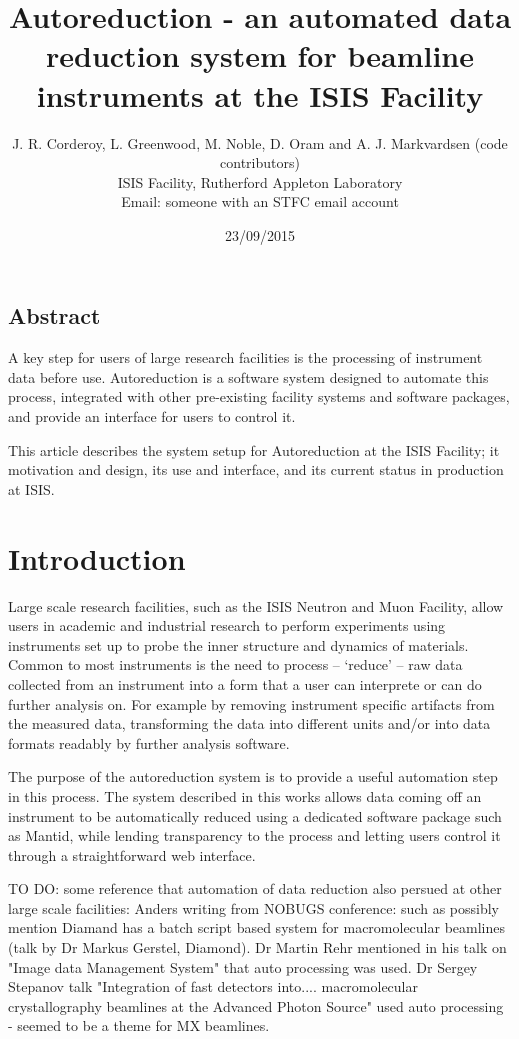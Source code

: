 \documentclass[twocolumn]{article}
\title{\textbf{Autoreduction - an automated data reduction system for beamline instruments at the ISIS Facility}}
\author{J. R. Corderoy, L. Greenwood, M. Noble, D. Oram and A. J. Markvardsen (code contributors)\\
ISIS Facility, Rutherford Appleton Laboratory\\
Email: someone with an STFC email account}
\date{23/09/2015}
\begin{document}
\maketitle

\subsection*{Abstract}\label{abstract}

A key step for users of large research facilities is the
processing of instrument data before use. Autoreduction is a software
system designed to automate this process, integrated with other
pre-existing facility systems and software packages, and provide
an interface for users to control it.

This article describes the system setup for Autoreduction at the ISIS Facility;
it motivation and design, its use and interface, and its current status in production at ISIS.

\section{Introduction}\label{introduction}

Large scale research facilities, such as the ISIS Neutron and Muon
Facility, allow users in academic and industrial research
to perform experiments using instruments set up to probe the inner 
structure and dynamics of materials. 
Common to most instruments is the need to process -- 
`reduce' -- raw data collected from an instrument into a form
that a user can interprete or can do further analysis on. For example
by removing instrument specific artifacts from the measured data, 
transforming the data into different units and/or
into data formats readably by further analysis software.

The purpose of the autoreduction system is to provide a useful automation
step in this process. The system described in this works allows data coming 
off an instrument to be automatically reduced using a dedicated software package 
such as Mantid\cite{mantid}, while lending transparency to the process and
letting users control it through a straightforward web interface.

TO DO: some reference that automation of data reduction also persued at
other large scale facilities: Anders writing from NOBUGS conference: such as 
possibly mention Diamand has a batch script based system 
for macromolecular beamlines (talk by Dr Markus Gerstel, Diamond). Dr Martin Rehr 
mentioned in his talk on "Image data Management System" that auto processing was
used. Dr Sergey Stepanov talk "Integration of fast detectors into.... macromolecular
crystallography beamlines at the Advanced Photon Source" used auto processing - seemed
to be a theme for MX beamlines.  
\end{document}
